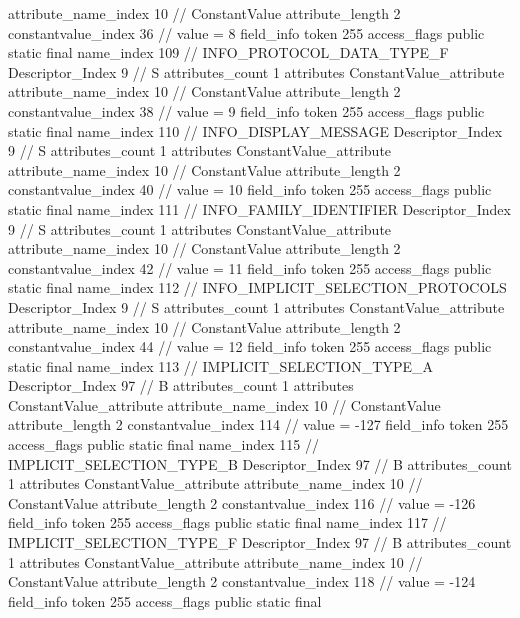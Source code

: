 {{{{{{{					attribute_name_index	10		// ConstantValue
					attribute_length	2
					constantvalue_index	36		// value = 8
				}
				}
			}
			field_info {
				token	255
				access_flags	public static final
				name_index	109		// INFO_PROTOCOL_DATA_TYPE_F
				Descriptor_Index	9		// S
				attributes_count	1
				attributes {
				ConstantValue_attribute {
					attribute_name_index	10		// ConstantValue
					attribute_length	2
					constantvalue_index	38		// value = 9
				}
				}
			}
			field_info {
				token	255
				access_flags	public static final
				name_index	110		// INFO_DISPLAY_MESSAGE
				Descriptor_Index	9		// S
				attributes_count	1
				attributes {
				ConstantValue_attribute {
					attribute_name_index	10		// ConstantValue
					attribute_length	2
					constantvalue_index	40		// value = 10
				}
				}
			}
			field_info {
				token	255
				access_flags	public static final
				name_index	111		// INFO_FAMILY_IDENTIFIER
				Descriptor_Index	9		// S
				attributes_count	1
				attributes {
				ConstantValue_attribute {
					attribute_name_index	10		// ConstantValue
					attribute_length	2
					constantvalue_index	42		// value = 11
				}
				}
			}
			field_info {
				token	255
				access_flags	public static final
				name_index	112		// INFO_IMPLICIT_SELECTION_PROTOCOLS
				Descriptor_Index	9		// S
				attributes_count	1
				attributes {
				ConstantValue_attribute {
					attribute_name_index	10		// ConstantValue
					attribute_length	2
					constantvalue_index	44		// value = 12
				}
				}
			}
			field_info {
				token	255
				access_flags	public static final
				name_index	113		// IMPLICIT_SELECTION_TYPE_A
				Descriptor_Index	97		// B
				attributes_count	1
				attributes {
				ConstantValue_attribute {
					attribute_name_index	10		// ConstantValue
					attribute_length	2
					constantvalue_index	114		// value = -127
				}
				}
			}
			field_info {
				token	255
				access_flags	public static final
				name_index	115		// IMPLICIT_SELECTION_TYPE_B
				Descriptor_Index	97		// B
				attributes_count	1
				attributes {
				ConstantValue_attribute {
					attribute_name_index	10		// ConstantValue
					attribute_length	2
					constantvalue_index	116		// value = -126
				}
				}
			}
			field_info {
				token	255
				access_flags	public static final
				name_index	117		// IMPLICIT_SELECTION_TYPE_F
				Descriptor_Index	97		// B
				attributes_count	1
				attributes {
				ConstantValue_attribute {
					attribute_name_index	10		// ConstantValue
					attribute_length	2
					constantvalue_index	118		// value = -124
				}
				}
			}
			field_info {
				token	255
				access_flags	public static final
}}}}}
